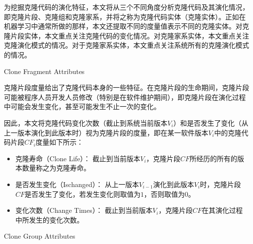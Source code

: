 为挖掘克隆代码的演化特征，本文将从三个不同角度分析克隆代码及其演化情况，即克隆片段、克隆组和克隆家系，并将之称为克隆代码实体（克隆实体）。正如在机器学习中通常所做的那样，本文还提取不同的度量值表示不同的克隆实体。对克隆片段实体，本文重点关注克隆代码的变化情况。对克隆家系实体，本文重点关注克隆演化模式的情况。对于克隆家系实体，本文重点关注系统所有的克隆演化模式的情况。

{Clone Fragment Attributes}

克隆片段度量给出了克隆代码本身的一些特征。在克隆片段的生命期间，克隆片段可能被程序人员开发人员修改（特别是在软件维护期间），即克隆片段在演化过程中可能会发生变化，甚至可能发生不止一次的变化。

因此，本文将克隆代码变化次数（截止到系统当前版本$V_i$）和是否发生了变化（从上一版本演化到此版本时）视为克隆片段的度量，即在某一软件版本$V_ i $中的克隆代码片段{$CF_i$}度量如下所示：
\begin{itemize}
\item
克隆寿命（Clone Life）：
截止到当前版本$V_ i $，克隆片段$CF$所经历的所有的版本数量称之为克隆寿命。
\item
是否发生变化（Ischanged）：
从上一版本$V_ {i-1} $演化到此版本$V_ i $时，克隆片段$CF$是否发生了变化，若发生变化则取值为$1$，否则取值为$0$。
\item
变化次数（Change Times）：
截止到当前版本$V_ i $，克隆片段$CF$在其演化过程中所发生的变化次数。
\end{itemize}

{Clone Group Attributes}

